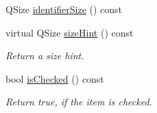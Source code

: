 \begin{DoxyCompactItemize}
\item 
Q\-Size \hyperlink{class_qwt_legend_item_a3b948f33ab0bfc898ffe5260a9de87dc}{identifier\-Size} () const 
\item 
virtual Q\-Size \hyperlink{class_qwt_legend_item_a6248ff72fbbdf1997a590fb0a2d7088f}{size\-Hint} () const 
\begin{DoxyCompactList}\small\item\em Return a size hint. \end{DoxyCompactList}\item 
bool \hyperlink{class_qwt_legend_item_a89c9b96ad3dc37f31ec92779a3899d23}{is\-Checked} () const 
\begin{DoxyCompactList}\small\item\em Return true, if the item is checked. \end{DoxyCompactList}\end{DoxyCompactItemize}
